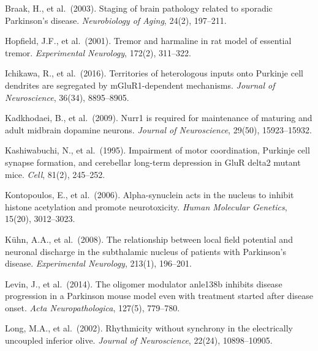 \documentclass[12pt,a4paper]{article}
\begin{document}
\begin{enumerate}[label={[\arabic*]}, leftmargin=2.5em, itemsep=0.3em]

  \item Braak, H., et al.\ (2003). Staging of brain pathology related to
    sporadic Parkinson's disease. \textit{Neurobiology of Aging}, 24(2),
    197--211.

  \item Hopfield, J.F., et al.\ (2001). Tremor and harmaline in rat model
    of essential tremor. \textit{Experimental Neurology}, 172(2), 311--322.

  \item Ichikawa, R., et al.\ (2016). Territories of heterologous inputs onto
    Purkinje cell dendrites are segregated by mGluR1-dependent
    mechanisms. \textit{Journal of Neuroscience}, 36(34), 8895--8905.

  \item Kadkhodaei, B., et al.\ (2009). Nurr1 is required for maintenance
    of maturing and adult midbrain dopamine neurons.
    \textit{Journal of Neuroscience}, 29(50), 15923--15932.

  \item Kashiwabuchi, N., et al.\ (1995). Impairment of motor coordination,
    Purkinje cell synapse formation, and cerebellar long-term depression in
    GluR delta2 mutant mice. \textit{Cell}, 81(2), 245--252.

  \item Kontopoulos, E., et al.\ (2006). Alpha-synuclein acts in the nucleus
    to inhibit histone acetylation and promote neurotoxicity.
    \textit{Human Molecular Genetics}, 15(20), 3012--3023.

  \item Kühn, A.A., et al.\ (2008). The relationship between local field
    potential and neuronal discharge in the subthalamic nucleus of patients
    with Parkinson's disease. \textit{Experimental Neurology}, 213(1),
    196--201.

  \item Levin, J., et al.\ (2014). The oligomer modulator anle138b inhibits
    disease progression in a Parkinson mouse model even with treatment started
    after disease onset. \textit{Acta Neuropathologica}, 127(5), 779--780.

  \item Long, M.A., et al.\ (2002). Rhythmicity without synchrony in the
    electrically uncoupled inferior olive. \textit{Journal of Neuroscience},
    22(24), 10898--10905.


\end{enumerate}
\end{document}
